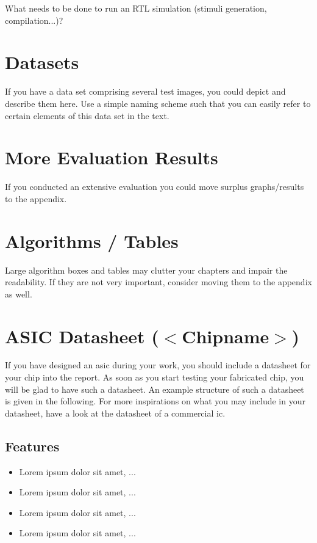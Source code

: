 \begin{flushleft}
\end{flushleft}

What needs to be done to run an RTL simulation (stimuli generation,
compilation...)?


\chapter{Datasets}
If you have a data set comprising several test images, you could
depict and describe them here. Use a simple naming scheme such that
you can easily refer to certain elements of this data set in the text.


\chapter{More Evaluation Results}
If you conducted an extensive evaluation you could move surplus
graphs/results to the appendix.


\chapter{Algorithms / Tables}
Large algorithm boxes and tables may clutter your chapters and impair
the readability. If they are not very important, consider moving them
to the appendix as well.


\chapter{ASIC Datasheet ($<$Chipname$>$)}

If you have designed an \gls{asic} during your work, you should
include a datasheet for your chip into the report. As soon as you
start testing your fabricated chip, you will be glad to have such a
datasheet. An example structure of such a datasheet is given in the
following. For more inspirations on what you may include in your
datasheet, have a look at the datasheet of a commercial \gls{ic}.

\minitoc

\section{Features}
\begin{itemize}
\item Lorem ipsum dolor sit amet, ...
\item Lorem ipsum dolor sit amet, ...
\item Lorem ipsum dolor sit amet, ...
\item Lorem ipsum dolor sit amet, ...
\end{itemize}

